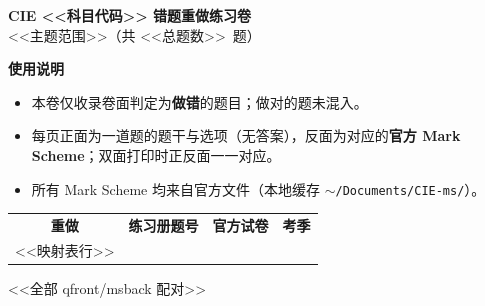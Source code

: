 \documentclass[11pt]{article}
\newcommand{\qfront}[5]{%
\thispagestyle{fancy}%
\begin{tcolorbox}[enhanced,colback=qcol!8,colframe=qcol,boxrule=1pt,arc=1.5mm,
  title={\bfseries\color{white}重做练习 \hspace{2mm}#1\ /\ \TOTALQ\hspace{6mm}练习册 #2},colbacktitle=qcol]
{\small #3}
\end{tcolorbox}\vspace{2mm}
\begin{tcolorbox}[enhanced,colback=white,colframe=qcol!50,boxrule=0.6pt,arc=1.2mm,left=3mm,right=3mm,top=2mm,bottom=2mm]
#4
\end{tcolorbox}\vspace{2mm}
\begin{tcolorbox}[enhanced,colback=white,colframe=qcol!50,boxrule=0.6pt,arc=1.2mm,left=3mm,right=3mm,top=2mm,bottom=2mm]
\textbf{选项}\\[1mm]#5
\end{tcolorbox}\vspace{3mm}
\begin{tcolorbox}[enhanced,height fill,colback=lightgray,colframe=gray!40,boxrule=0.5pt,arc=1.2mm,left=2mm,right=2mm,top=1.5mm,bottom=1.5mm,valign=top]
\textbf{我的作答：}\underline{\hspace{18mm}}\hfill\textbf{所用时间：}\underline{\hspace{18mm}}\\[2mm]
\textbf{计算过程：}
\end{tcolorbox}
\clearpage}
\newcommand{\msback}[5]{%
\thispagestyle{fancy}%
\begin{tcolorbox}[enhanced,colback=mscol!8,colframe=mscol,boxrule=1pt,arc=1.5mm,
  title={\bfseries\color{white}官方 Mark Scheme\hspace{6mm}对应：重做练习 #1（练习册 #2）},colbacktitle=mscol]
{}
\end{tcolorbox}\vspace{2mm}
\begin{tcolorbox}[enhanced,colback=white,colframe=mscol!55,boxrule=0.6pt,arc=1.2mm,left=3mm,right=3mm,top=2mm,bottom=2mm]
\textbf{官方出处与原文}\\[1mm]
{\small #3}\\[2.5mm]
\textbf{正确答案：}{\large\bfseries\color{mscol}#4}
\end{tcolorbox}\vspace{2mm}
\begin{tcolorbox}[enhanced,colback=white,colframe=mscol!55,boxrule=0.6pt,arc=1.2mm,left=3mm,right=3mm,top=2mm,bottom=2mm]
\textbf{评分要点}\\[1mm]#5
\end{tcolorbox}
\clearpage}
\newcommand{\TOTALQ}{<<总题数>>}   %
\begin{document}
\pagestyle{fancy}\fancyhf{}
\fancyfoot[C]{\small\thepage}
\renewcommand{\headrulewidth}{0.4pt}

\begin{center}
\vspace*{18mm}
  {\Huge\bfseries\color{qcol} CIE <<科目代码>> 错题重做练习卷}\\[6mm]
  {\large <<主题范围>>（共 \TOTALQ\ 题）}
\end{center}
\vspace{6mm}
\begin{tcolorbox}[enhanced,colback=white,colframe=qcol!60,boxrule=0.8pt,arc=1.5mm,left=4mm,right=4mm,top=2.5mm,bottom=2.5mm]
\textbf{使用说明}
\begin{itemize}
  \item 本卷仅收录卷面判定为\textbf{做错}的题目；做对的题未混入。
  \item 每页正面为一道题的题干与选项（无答案），反面为对应的\textbf{官方 Mark Scheme}；双面打印时正反面一一对应。
  \item 所有 Mark Scheme 均来自官方文件（本地缓存 \texttt{$\sim$/Documents/CIE-ms/}）。
\end{itemize}
\end{tcolorbox}
\vspace{4mm}
\begin{center}
\renewcommand{\arraystretch}{1.3}
{\small
\begin{tabular}{clll}
\textbf{重做} & \textbf{练习册题号} & \textbf{官方试卷} & \textbf{考季}\\
<<映射表行>>
\end{tabular}}
\end{center}
\clearpage

%

<<全部 qfront/msback 配对>>
\end{document}

